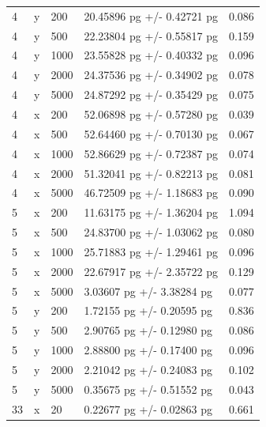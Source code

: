 \documentclass[12pt]{article}
\begin{document}
\begin{longtable}{lllll}
4         & y        & 200  & 20.45896 pg +/- 0.42721 pg   & 0.086                  \\
4         & y        & 500  & 22.23804 pg +/- 0.55817 pg   & 0.159                  \\
4         & y        & 1000 & 23.55828 pg +/- 0.40332 pg   & 0.096                  \\
4         & y        & 2000 & 24.37536 pg +/- 0.34902 pg   & 0.078                  \\
4         & y        & 5000 & 24.87292 pg +/- 0.35429 pg   & 0.075                  \\
4         & x        & 200  & 52.06898 pg +/- 0.57280 pg   & 0.039                  \\
4         & x        & 500  & 52.64460 pg +/- 0.70130 pg   & 0.067                  \\
4         & x        & 1000 & 52.86629 pg +/- 0.72387 pg   & 0.074                  \\
4         & x        & 2000 & 51.32041 pg +/- 0.82213 pg   & 0.081                  \\
4         & x        & 5000 & 46.72509 pg +/- 1.18683 pg   & 0.090                  \\
5         & x        & 200  & 11.63175 pg +/- 1.36204 pg   & 1.094                  \\
5         & x        & 500  & 24.83700 pg +/- 1.03062 pg   & 0.080                  \\
5         & x        & 1000 & 25.71883 pg +/- 1.29461 pg   & 0.096                  \\
5         & x        & 2000 & 22.67917 pg +/- 2.35722 pg   & 0.129                  \\
5         & x        & 5000 & 3.03607 pg +/- 3.38284 pg    & 0.077                  \\
5         & y        & 200  & 1.72155 pg +/- 0.20595 pg    & 0.836                  \\
5         & y        & 500  & 2.90765 pg +/- 0.12980 pg    & 0.086                  \\
5         & y        & 1000 & 2.88800 pg +/- 0.17400 pg    & 0.096                  \\
5         & y        & 2000 & 2.21042 pg +/- 0.24083 pg    & 0.102                  \\
5         & y        & 5000 & 0.35675 pg +/- 0.51552 pg    & 0.043                  \\
33        & x        & 20   & 0.22677 pg +/- 0.02863 pg    & 0.661                  \\

\end{longtable}
\end{document}
